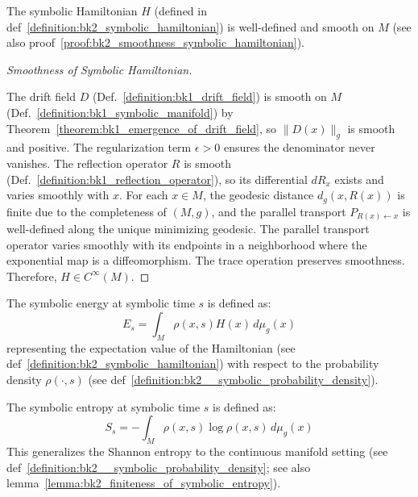 \begin{lemma} 
\label{lemma:bk2_wellposedness_symb_hamiltonian} 
The symbolic Hamiltonian $H$ (defined in def~\ref{definition:bk2_symbolic_hamiltonian}) is well-defined and smooth on $M$ (see also proof~\ref{proof:bk2_smoothness_symbolic_hamiltonian}).
\end{lemma}

\begin{proof}[Smoothness of Symbolic Hamiltonian]
\label{proof:bk2_smoothness_symbolic_hamiltonian}
\leavevmode

The drift field $D$ (Def.~\ref{definition:bk1_drift_field}) is smooth on $M$ (Def.~\ref{definition:bk1_symbolic_manifold}) by Theorem~\ref{theorem:bk1_emergence_of_drift_field}, so $\|D(x)\|_g$ is smooth and positive. The regularization term $\epsilon > 0$ ensures the denominator never vanishes. The reflection operator $R$ is smooth (Def.~\ref{definition:bk1_reflection_operator}), so its differential $dR_x$ exists and varies smoothly with $x$. For each $x \in M$, the geodesic distance $d_g(x, R(x))$ is finite due to the completeness of $(M, g)$, and the parallel transport $P_{R(x) \leftarrow x}$ is well-defined along the unique minimizing geodesic. The parallel transport operator varies smoothly with its endpoints in a neighborhood where the exponential map is a diffeomorphism. The trace operation preserves smoothness. Therefore, $H \in C^\infty(M)$.
\end{proof}

\begin{definition} 
\label{definition:bk2_symbolic_energy} 
The symbolic energy at symbolic time $s$ is defined as:
\[
E_s = \int_M \rho(x,s) H(x) \, d\mu_g(x)
\]
representing the expectation value of the Hamiltonian (see def~\ref{definition:bk2_symbolic_hamiltonian}) with respect to the probability density $\rho(\cdot,s)$ (see def~\ref{definition:bk2__symbolic_probability_density}).
\end{definition}

\begin{definition} 
\label{definition:bk2_symbolic_entropy} 
The symbolic entropy at symbolic time $s$ is defined as:
\[
S_s = -\int_M \rho(x,s) \log\rho(x,s) \, d\mu_g(x)
\]
This generalizes the Shannon entropy to the continuous manifold setting (see def~\ref{definition:bk2__symbolic_probability_density}; see also lemma~\ref{lemma:bk2_finiteness_of_symbolic_entropy}).
\end{definition}

